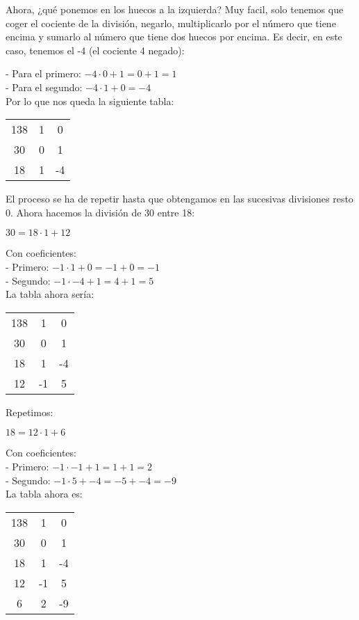\documentclass[11pt, a4paper, titlepage]{article}
\begin{document}
Ahora, ¿qué ponemos en los huecos a la izquierda? Muy facil, solo tenemos que coger el cociente de la división, negarlo, multiplicarlo por el número que tiene encima y sumarlo al número que tiene dos huecos por encima. Es decir, en este caso, tenemos el -4 (el cociente 4 negado):

- Para el primero: $ -4 \cdot 0 + 1 = 0 + 1 = 1 $ \\
- Para el segundo: $ -4 \cdot 1 + 0 = -4 $ \\

Por lo que nos queda la siguiente tabla:


\begin{center}
\begin{tabular}{c|cc}
138 & 1 & 0 \\
30 & 0 & 1 \\
\hline
18 & 1 & -4 \\
\end{tabular}
\end{center}

El proceso se ha de repetir hasta que obtengamos en las sucesivas divisiones resto 0. Ahora hacemos la
división de 30 entre 18:

$ 30 = 18 \cdot 1 + 12 $

Con coeficientes: \\
- Primero: $ -1 \cdot 1 + 0 = -1 + 0 = -1 $ \\
- Segundo: $ -1 \cdot -4 + 1 = 4 + 1 = 5 $ \\

La tabla ahora sería:

\begin{center}
\begin{tabular}{c|cc}
138 & 1 & 0 \\
30 & 0 & 1 \\
\hline
18 & 1 & -4 \\
\hline
12 & -1 & 5
\end{tabular}
\end{center}


Repetimos:

$ 18 = 12 \cdot 1 + 6 $

Con coeficientes: \\
- Primero: $ -1 \cdot -1 + 1 = 1 + 1 = 2 $ \\
- Segundo: $ -1 \cdot 5 + -4 = -5 + -4 = -9 $ \\

La tabla ahora es:

\begin{center}
\begin{tabular}{c|cc}
138 & 1 & 0 \\
30 & 0 & 1 \\
\hline
18 & 1 & -4 \\
\hline
12 & -1 & 5 \\
\hline
6 & 2 & -9 \\
\end{tabular}
\end{center}
\end{document}
